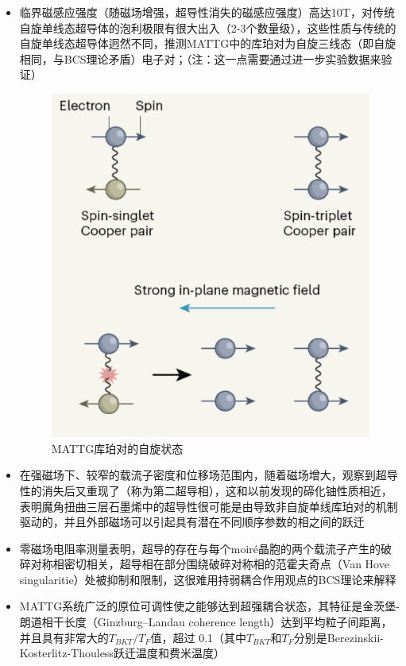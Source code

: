 \begin{itemize}
    \item 临界磁感应强度（随磁场增强，超导性消失的磁感应强度）高达10T，对传统自旋单线态超导体的泡利极限有很大出入（2-3个数量级），这些性质与传统的自旋单线态超导体迥然不同，推测MATTG中的库珀对为自旋三线态（即自旋相同，与BCS理论矛盾）电子对；（注：这一点需要通过进一步实验数据来验证）

          \begin{figure}
              \centering
              \includegraphics[scale=0.6]{img/自旋.png}
              \caption{MATTG库珀对的自旋状态}
          \end{figure}

    \item 在强磁场下、较窄的载流子密度和位移场范围内，随着磁场增大，观察到超导性的消失后又重现了（称为第二超导相），这和以前发现的碲化铀性质相近，表明魔角扭曲三层石墨烯中的超导性很可能是由导致非自旋单线库珀对的机制驱动的，并且外部磁场可以引起具有潜在不同顺序参数的相之间的跃迁
    \item 零磁场电阻率测量表明，超导的存在与每个moiré晶胞的两个载流子产生的破碎对称相密切相关，超导相在部分围绕破碎对称相的范霍夫奇点（Van Hove singularitie）处被抑制和限制，这很难用持弱耦合作用观点的BCS理论来解释
    \item MATTG系统广泛的原位可调性使之能够达到超强耦合状态，其特征是金茨堡-朗道相干长度（Ginzburg–Landau coherence length）达到平均粒子间距离，并且具有非常大的$T_{BKT}/T_F$值，超过 0.1（其中$T_{BKT}$和$T_F$分别是Berezinskii-Kosterlitz-Thouless跃迁温度和费米温度）
\end{itemize}

